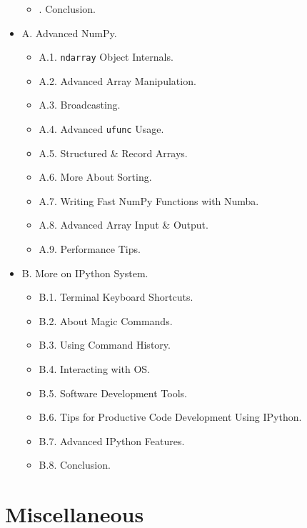 \documentclass{article}
\begin{document}
\begin{itemize}
\begin{itemize}
		\item {. Conclusion.}
	\end{itemize}
	\item {\sf A. Advanced NumPy.}
	\begin{itemize}
		\item {\sf A.1. {\tt ndarray} Object Internals.}
		\item {\sf A.2. Advanced Array Manipulation.}
		\item {\sf A.3. Broadcasting.}
		\item {\sf A.4. Advanced {\tt ufunc} Usage.}
		\item {\sf A.5. Structured \& Record Arrays.}
		\item {\sf A.6. More About Sorting.}
		\item {\sf A.7. Writing Fast NumPy Functions with Numba.}
		\item {\sf A.8. Advanced Array Input \& Output.}
		\item {\sf A.9. Performance Tips.}
	\end{itemize}
	\item {\sf B. More on IPython System.}
	\begin{itemize}
		\item {\sf B.1. Terminal Keyboard Shortcuts.}
		\item {\sf B.2. About Magic Commands.}
		\item {\sf B.3. Using Command History.}
		\item {\sf B.4. Interacting with OS.}
		\item {\sf B.5. Software Development Tools.}
		\item {\sf B.6. Tips for Productive Code Development Using IPython.}
		\item {\sf B.7. Advanced IPython Features.}
		\item {\sf B.8. Conclusion.}
	\end{itemize}
\end{itemize}



\section{Miscellaneous}


\printbibliography[heading=bibintoc]
	
\end{document}
